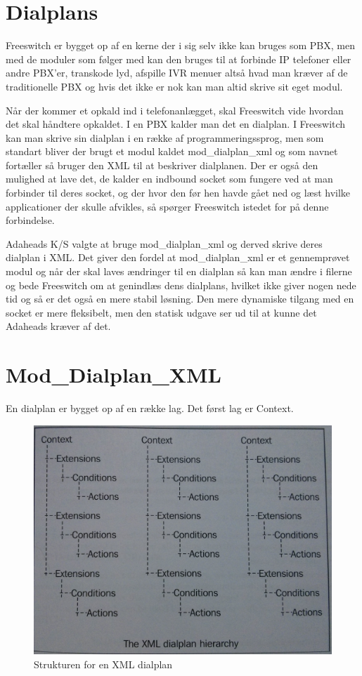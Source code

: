 \section{Dialplans}
Freeswitch er bygget op af en kerne der i sig selv ikke kan bruges som PBX, men med de moduler som følger med kan den bruges til at forbinde IP telefoner eller andre PBX'er, transkode lyd, afspille IVR menuer altså hvad man kræver af de traditionelle PBX og hvis det ikke er nok kan man altid skrive sit eget modul.

Når der kommer et opkald ind i telefonanlægget, skal Freeswitch vide hvordan det skal håndtere opkaldet. I en PBX kalder man det en dialplan.  
I Freeswitch kan man skrive sin dialplan i en række af programmeringssprog, men som standart bliver der brugt et modul kaldet mod\_dialplan\_xml og som navnet fortæller så bruger den XML til at beskriver dialplanen. Der er også den mulighed at lave det, de kalder en indbound socket som fungere ved at man forbinder til deres socket, og der hvor den før hen havde gået ned og læst hvilke applicationer der skulle afvikles, så spørger Freeswitch istedet for på denne forbindelse. 

Adaheads K/S valgte at bruge mod\_dialplan\_xml og derved skrive deres dialplan i XML. Det giver den fordel at mod\_dialplan\_xml er et gennemprøvet modul og når der skal laves ændringer til en dialplan så kan man ændre i filerne og bede Freeswitch om at genindlæs dens dialplans, hvilket ikke giver nogen nede tid og så er det også en mere stabil løsning. Den mere dynamiske tilgang med en socket er mere fleksibelt, men den statisk udgave ser ud til at kunne det Adaheads kræver af det.

\section{Mod\_Dialplan\_XML}
En dialplan er bygget op af en række lag. Det først lag er Context. 
\begin{figure}[ht!]
\centering
\includegraphics[scale=0.12]{images/dialplanstructure.jpg}
\caption{Strukturen for en XML dialplan\citep{freeswitch12}}
\label{fig:xmldialplan}
\end{figure}

